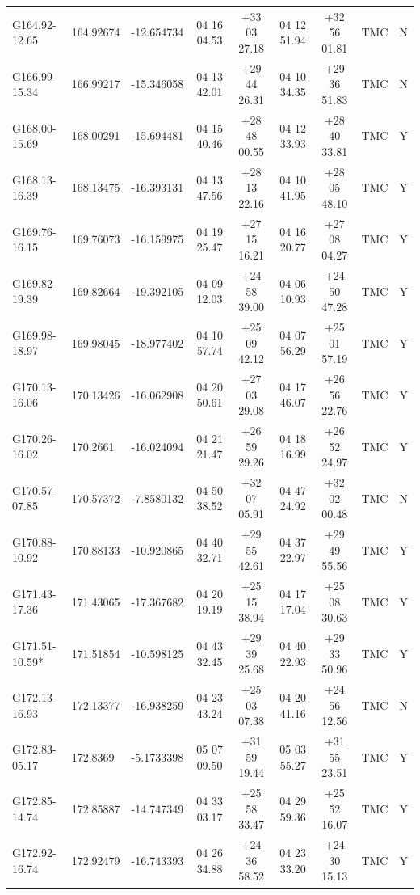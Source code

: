 \documentclass[UTF8, nocolorlinks]{pkuthss}
\begin{document}
\begin{footnotesize}
\begin{center}
\begin{supertabular}{lllcccclr}
		G164.92-12.65 & 164.92674 &  -12.654734   & 04 16 04.53 & +33 03 27.18 & 04 12 51.94 & +32 56 01.81   & TMC  & N\\
		G166.99-15.34 & 166.99217 &  -15.346058   & 04 13 42.01 & +29 44 26.31 & 04 10 34.35 & +29 36 51.83   & TMC  & N\\
		G168.00-15.69 & 168.00291 &  -15.694481   & 04 15 40.46 & +28 48 00.55 & 04 12 33.93 & +28 40 33.81   & TMC  & Y\\
		G168.13-16.39 & 168.13475 &  -16.393131   & 04 13 47.56 & +28 13 22.16 & 04 10 41.95 & +28 05 48.10   & TMC  & Y\\
		G169.76-16.15 & 169.76073 &  -16.159975   & 04 19 25.47 & +27 15 16.21 & 04 16 20.77 & +27 08 04.27   & TMC  & Y\\
		G169.82-19.39 & 169.82664 &  -19.392105   & 04 09 12.03 & +24 58 39.00 & 04 06 10.93 & +24 50 47.28   & TMC  & Y\\
		G169.98-18.97 & 169.98045 &  -18.977402   & 04 10 57.74 & +25 09 42.12 & 04 07 56.29 & +25 01 57.19   & TMC  & Y\\
		G170.13-16.06 & 170.13426 &  -16.062908   & 04 20 50.61 & +27 03 29.08 & 04 17 46.07 & +26 56 22.76   & TMC  & Y\\
		G170.26-16.02 & 170.2661  &  -16.024094   & 04 21 21.47 & +26 59 29.26 & 04 18 16.99 & +26 52 24.97   & TMC  & Y\\
		G170.57-07.85 & 170.57372 &   -7.8580132  & 04 50 38.52 & +32 07 05.91 & 04 47 24.92 & +32 02 00.48   & TMC  & N\\
		G170.88-10.92 & 170.88133 &  -10.920865   & 04 40 32.71 & +29 55 42.61 & 04 37 22.97 & +29 49 55.56   & TMC  & Y\\
		G171.43-17.36 & 171.43065 &  -17.367682   & 04 20 19.19 & +25 15 38.94 & 04 17 17.04 & +25 08 30.63   & TMC  & Y\\
		G171.51-10.59*& 171.51854 &  -10.598125   & 04 43 32.45 & +29 39 25.68 & 04 40 22.93 & +29 33 50.96   & TMC  & Y\\
		G172.13-16.93 & 172.13377 &  -16.938259   & 04 23 43.24 & +25 03 07.38 & 04 20 41.16 & +24 56 12.56   & TMC  & N\\
		G172.83-05.17 & 172.8369  &   -5.1733398  & 05 07 09.50 & +31 59 19.44 & 05 03 55.27 & +31 55 23.51   & TMC  & Y\\
		G172.85-14.74 & 172.85887 &  -14.747349   & 04 33 03.17 & +25 58 33.47 & 04 29 59.36 & +25 52 16.07   & TMC  & Y\\
		G172.92-16.74 & 172.92479 &  -16.743393   & 04 26 34.88 & +24 36 58.52 & 04 23 33.20 & +24 30 15.13   & TMC  & Y\\

\end{supertabular}
\end{center}
\end{footnotesize}
\end{document}
